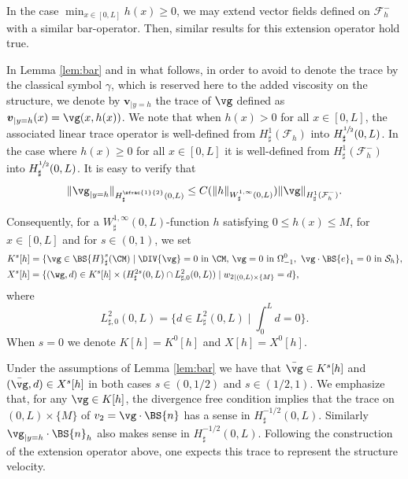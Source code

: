 \skpt
\begin{remark}
\label{rem:domaine}
\begin{enumeratei}
\item In the case $\min_{x\in [0, L]} h(x)\geq 0$, we may extend vector fields defined on $\mathcal{F}^-_h$ with a similar bar-operator. Then, similar results for this extension operator hold true.

\item In Lemma \ref{lem:bar} and in what follows, in order to avoid to denote the trace by the classical symbol $\gamma$, which is reserved here to the added viscosity on the structure, we denote by ${\boldsymbol v}_{|{y=h}}$ the trace of $\vg$ defined as ${\boldsymbol v}_{|{y=h}}(x)=\vg(x, h(x))$. We note that when $h(x)>0$ for all $x\in [0, L]$, the associated linear trace operator is well-defined from $H_\sharp^1(\mathcal{F}_h)$ into $H_\sharp^{\sfrac{1}{2}}(0, L)$. In the case where $h(x)\geq0$ for all $x\in [0, L]$ it is well-defined from $H_\sharp^1(\mathcal{F}^-_h)$ into $H_\sharp^{\sfrac{1}{2}}(0, L)$. It is easy to verify that
\begin{equation}
\label{est:trace}
\|\vg_{|{y=h}}\|_{H^{\sfrac{1}{2}}_\sharp(0, L)}\leq C(\|h\|_{W_\sharp^{1, \infty}(0, L)}) \|\vg\|_{H^1_\sharp(\mathcal{F}^-_h)}.
\end{equation}
\end{enumeratei}

\end{remark}
Consequently, for a $W^{1, \infty}_{\sharp}(0,L)$-function $h$ satisfying $0 \leq h(x) \leq M$, for $x\in [0, L]$ and for $s \in (0,1)$, we set
\begin{align}
&K^{s}[h]=\{\vg\in \BS{H}^{s}_{\sharp}(\CM)\mid \DIV{\vg}=0\text{ in }\CM,\,\vg=0\text{ in }\Omega_{-1}^{0},\,\,\vg\cdot\BS{e}_{1}=0\text{ in }\mathcal{S}_{h}\},\label{espace.Ks}\\
&X^{s}[h]=\{(\wg,d)\in K^{s}[h]\times (H^{2s}_{\sharp}(0,L)\cap L_{\sharp, 0}^{2}(0,L))\mid {w_{2}}_{|{(0, L)\times \{M\}}}=d\},\label{espace.Xs}
\end{align}
where
\[\textstyle
L_{\sharp, 0}^{2}(0,L)= \bigl\{d\in L_{\sharp}^{2}(0,L) \mid \int_0^L d =0\bigl\}.
\]
When $s=0$ we denote $K[h] = K^0[h]$ and $X[h] = X^0[h]$.

Under the assumptions of Lemma \ref{lem:bar}
we have that $\bar{\vg} \in K^s[h]$ and $(\bar{\vg},d) \in X^s[h]$ in both cases $s \in (0,1/2)$ and $s \in (1/2,1)$.
We emphasize that, for any $\vg\in K[h]$, the divergence free condition implies that the trace on ${(0, L)\times \{M\}}$ of ${v_{2}}=\vg\cdot\BS{n}$ has a sense in $H^{-1/2}_\sharp(0, L)$. Similarly $\vg_{|{y=h}}\cdot \BS{n}_h$ also makes sense in $H^{-1/2}_\sharp(0, L)$. Following the construction of the extension operator above, one expects this trace to represent the structure velocity.


